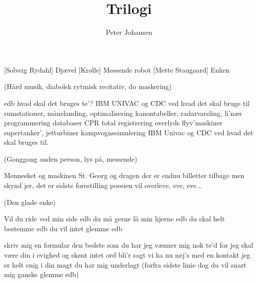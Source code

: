 \documentclass[a4paper,11pt]{article}
\title{Trilogi}
\author{Peter Johansen}
\begin{document}
\maketitle

\begin{roles}
[Solveig Rydahl] Djævel
[Krølle] Messende robot
[Mette Staugaard] Enken
\end{roles}

\begin{song}
(Hård musik, diabolsk rytmisk recitativ, do maskering)

edb
hvad skal det bruges te'?
IBM
UNIVAC og CDC
ved hvad det skal bruge til
rumstationer, månelanding,
optimalisering
kanontabeller, radarvarsling,
li'nær programmering
databaser CPR
total registrering
overlyds flyv'maskiner
supertanker', jetturbiner
kampvognssimulering
IBM
Univac og CDC
ved hvad det skal bruges til.

(Gonggong anden person, lys på, messende)

Mennesket og maskinen
St. Georg og dragen
der er endnu billetter tilbage
men skynd jer, det er
sidste forestilling
poesien vil overleve, eve, eve...

(Den glade enke)

Vil du ride
ved min side
edb
du må gerne
få min hjerne
edb
du skal helt bestemme
edb
du vil intet glemme
edb

skriv mig en formular
den bedste som du har
jeg vænner mig nok te'd
for jeg skal være din i evighed
og skønt intet ord bli'r sagt
vi ka nu nøj's med en kontakt
jeg er helt enig i din magt
du har mig underlagt
(forfra sidste linie dog
du vil snart mig ganske glemme
edb)

\end{song}
\end{document}

